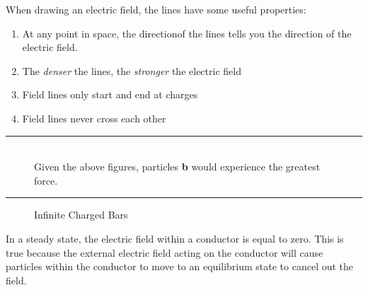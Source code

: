 \documentclass[12pt]{article}
\begin{document}
When drawing an electric field, the lines have some useful properties:
\begin{enumerate}
  \itemsep0em
  \item At any point in space, the directionof the lines tells you the direction of the electric
    field.
  \item The \textit{denser} the lines, the \textit{stronger} the electric field
  \item Field lines only start and end at charges
  \item Field lines never cross each other
\end{enumerate}

\vspace{12pt}
\hrule

\begin{figure}[h]
  \centering
   \\
  Given the above figures, particles \textbf{b} would experience the greatest force.
\end{figure}
\hrule

\begin{figure}[H]
  \centering
  
  \caption{Infinite Charged Bars}
  \label{fig:011}
\end{figure}

In a steady state, the electric field within a conductor is equal to zero. This is true because
the external electric field acting on the conductor will cause particles within the conductor
to move to an equilibrium state to cancel out the field.
\end{document}
